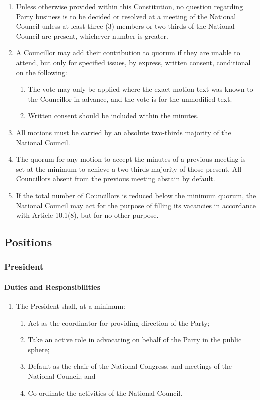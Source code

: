 \documentclass[a4paper,titlepage,8.5pt]{article}
\begin{document}
\begin{enumerate}
\item Unless otherwise provided within this Constitution, no question regarding Party business is to be decided or resolved at a meeting of the National Council unless at least three (3) members or two-thirds of the National Council are present, whichever number is greater.
\item A Councillor may add their contribution to quorum if they are unable to attend, but only for specified issues, by express, written consent, conditional on the following:
\begin{enumerate}
\item The vote may only be applied where the exact motion text was known to the Councillor in advance, and the vote is for the unmodified text.
\item Written consent should be included within the minutes.
\end{enumerate}
\item All motions must be carried by an absolute two-thirds majority of the National Council.
\item The quorum for any motion to accept the minutes of a previous meeting is set at the minimum to achieve a two-thirds majority of those present. All Councillors absent from the previous meeting abstain by default.
\item If the total number of Councillors is reduced below the minimum quorum, the National Council may act for the purpose of filling its vacancies in accordance with Article 10.1(8), but for no other purpose.
\end{enumerate}


\subsection{Positions}

\subsubsection{President}

\paragraph{Duties and Responsibilities}

\begin{enumerate}
\item The President shall, at a minimum:
\begin{enumerate}
\item Act as the coordinator for providing direction of the Party;
\item Take an active role in advocating on behalf of the Party in the public sphere;
\item Default as the chair of the National Congress, and meetings of the National Council; and
\item Co-ordinate the activities of the National Council.
\end{enumerate}
\end{enumerate}
\end{document}
